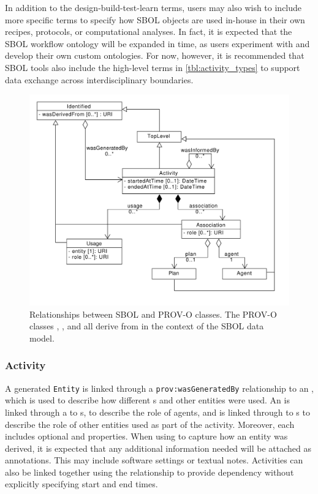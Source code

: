 In addition to the design-build-test-learn terms, users may also wish to include more specific terms to specify how SBOL objects are used in-house in their own recipes, protocols, or computational analyses. In fact, it is expected that the SBOL workflow ontology will be expanded in time, as users experiment with and develop their own custom ontologies. For now, however, it is recommended that SBOL tools also include the high-level terms in \ref{tbl:activity_types} to support data exchange across interdisciplinary boundaries.

\begin{figure}[ht]
\begin{center}
\includegraphics[scale=0.6]{uml/provenance}
\caption[]{Relationships between SBOL and PROV-O classes. The PROV-O classes , , and  all derive from  in the context of the SBOL data model.
\label{uml:provenance}}
\end{center}
\end{figure}

\subsubsection{Activity}
\label{sec:prov:Activity}

A generated \texttt{Entity} is linked through a \texttt{prov:wasGeneratedBy} relationship to an , which is used to describe how different s and other entities were used. An  is linked through a  to s, to describe the role of agents, and is linked through  to s to describe the role of other entities used as part of the activity. Moreover, each  includes optional  and  properties. When using  to capture how an entity was derived, it is expected that any additional information needed will be attached as annotations. This may include software settings or textual notes. Activities can also be linked together using the  relationship to provide dependency without explicitly specifying start and end times.

